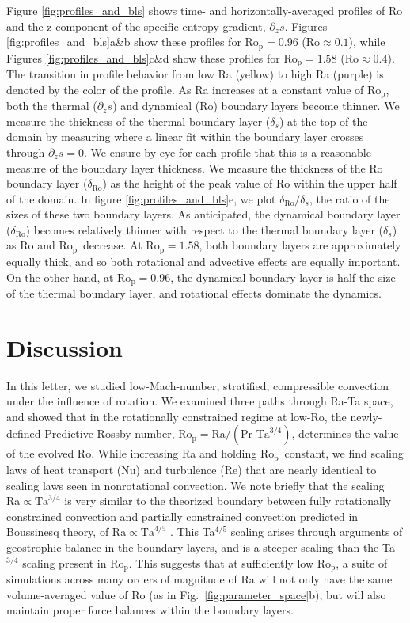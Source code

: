 \documentclass[twocolumn, amsmath, amsfonts, amssymb]{aastex62}
\newcommand{\pro}{\ensuremath{\text{Ro}_{\text{p}}}}
\begin{document}
Figure \ref{fig:profiles_and_bls} shows time- and horizontally-averaged profiles of
Ro and the z-component of the specific entropy gradient, $\partial_z s$.
Figures \ref{fig:profiles_and_bls}a\&b show these profiles for $\pro=0.96$ ($\text{Ro} \approx 0.1$), while
Figures \ref{fig:profiles_and_bls}c\&d show these profiles for $\pro=1.58$ ($\text{Ro} \approx 0.4$). The transition
in profile behavior from low Ra (yellow) to high Ra (purple) is denoted by the color of the
profile.
As Ra increases at a constant value of
\pro, both the thermal ($\partial_z s$) and dynamical (Ro) boundary layers become thinner. 
We measure the
thickness of the thermal boundary layer ($\delta_{s}$) at the top of the domain by 
measuring where a linear fit within the boundary layer crosses through $\partial_z s = 0$.
We ensure by-eye for each profile that this is a reasonable measure of the boundary
layer thickness. We measure
the thickness of the Ro boundary layer ($\delta_{\text{Ro}}$) 
as the height of the peak value of Ro within the
upper half of the domain.
In figure \ref{fig:profiles_and_bls}e, we plot $\delta_{\text{Ro}}/\delta_{s}$, the ratio
of the sizes of these two boundary layers. As anticipated, the dynamical boundary layer ($\delta_{\text{Ro}}$)
becomes relatively thinner with respect to the thermal boundary layer ($\delta_{s}$)
as Ro and \pro$\,$ decrease. At $\pro = 1.58$, both boundary layers are approximately equally
thick, and so both rotational and advective effects are equally important. On the other hand,
at $\pro = 0.96$, the dynamical boundary layer is half the size of the thermal boundary
layer, and rotational effects dominate the dynamics.

\section{Discussion}
\label{sec:discussion}
In this letter, we studied low-Mach-number, stratified, compressible convection 
under the influence of rotation.
We examined three paths through Ra-Ta space, and showed that in the rotationally
constrained regime at low-Ro, the newly-defined 
Predictive Rossby number, $\pro = \text{Ra}/(\text{Pr }\text{Ta}^{3/4})$, determines the value of
the evolved Ro. While increasing Ra and holding \pro$\,$ constant,
we find scaling laws of heat transport (Nu) and turbulence (Re) that are nearly identical
to scaling laws seen in nonrotational convection.
We note briefly that the scaling $\text{Ra} \propto \text{Ta}^{3/4}$ is very similar to
the theorized boundary between fully rotationally constrained convection and 
partially constrained convection predicted in Boussinesq theory, of 
$\text{Ra} \propto \text{Ta}^{4/5}$ \citep{julien&all2012, gastine&all2016}. This
Ta$^{4/5}$ scaling arises through arguments of geostrophic balance in the boundary layers,
and is a steeper scaling than the Ta$^{3/4}$ scaling present in \pro.
This suggests that at sufficiently low \pro, a suite of simulations across many orders
of magnitude of Ra will not only have the same volume-averaged value of Ro 
(as in Fig.~\ref{fig:parameter_space}b), but will
also maintain proper force balances within the boundary layers.
\end{document}
